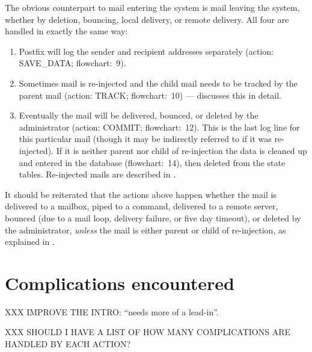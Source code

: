 \label{mail-delivery}

The obvious counterpart to mail entering the system is mail leaving the
system, whether by deletion, bouncing, local delivery, or remote delivery.
All four are handled in exactly the same way:

\begin{enumerate}

    \item Postfix will log the sender and recipient addresses separately
        (action: SAVE\_DATA\@; flowchart:~9).

    \item Sometimes mail is re-injected and the child mail needs to be
        tracked by the parent mail (action: TRACK\@; flowchart:~10) ---
         discusses this in
        detail.

    \item Eventually the mail will be delivered, bounced, or deleted by the
        administrator (action: COMMIT\@; flowchart:~12).  This is the last
        log line for this particular mail (though it may be indirectly
        referred to if it was re-injected).  If it is neither parent nor
        child of re-injection the data is cleaned up and entered in the
        database (flowchart:~14), then deleted from the state tables.
        Re-injected mails are described in .

\end{enumerate}

It should be reiterated that the actions above happen whether the mail is
delivered to a mailbox, piped to a command, delivered to a remote server,
bounced (due to a mail loop, delivery failure, or five day timeout), or
deleted by the administrator, \textit{unless\/} the mail is either parent
or child of re-injection, as explained in .

\section{Complications encountered}

\label{complications}

XXX IMPROVE THE INTRO\@: ``needs more of a lead-in''.

XXX SHOULD I HAVE A LIST OF HOW MANY COMPLICATIONS ARE HANDLED BY EACH
ACTION\@?

